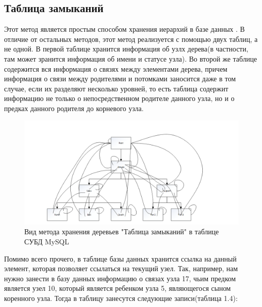 \documentclass[a4paper,14pt]{extreport}
\theoremstyle{definition}
\begin{document}
\subsection{Таблица замыканий}
Этот метод является простым способом хранения иерархий в базе данных \cite{Tarasov}. В отличие от остальных методов, этот метод реализуется с помощью двух таблиц, а не одной. В первой таблице хранится информация об узлх дерева(в частности, там может зранится информация об имени и статусе узла). Во второй же таблице содержится вся информация о связях между элементами дерева, причем информация о связи между родителями и потомками заносится даже в том случае, если их разделяют несколько уровней, то есть таблица содержит информацию не только о непосредственном родителе данного узла, но и о предках данного родителя до корневого узла.

\begin{figure}[h!]
\begin{center}
\includegraphics[width=12cm]{14.png}
\caption{Вид метода хранения деревьев "Таблица замыканий" в таблице СУБД MySQL}
\label{fig:3}
\end{center}
\end{figure}
 Помимо всего прочего, в таблице базы данных хранится ссылка на данный элемент, которая позволяет ссылаться на текущий узел. Так, например, нам нужно занести в базу данных информацию о связах узла 17, чьим предком является узел 10, который является ребенком узла 5, являющегося сыном коренного узла. Тогда в таблицу занесутся следующие записи(таблица 1.4):
\begin{table}[H]
\end{table}
\end{document}
